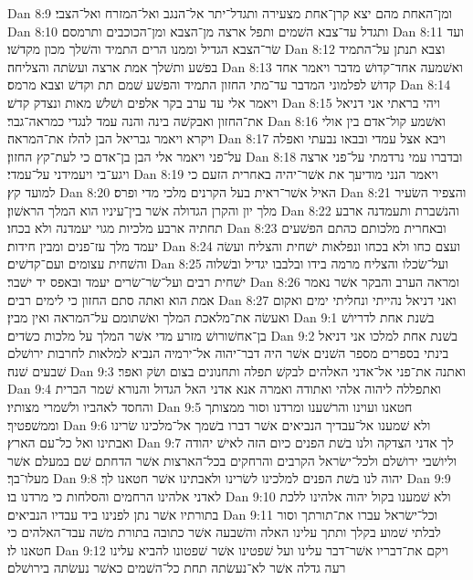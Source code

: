 Dan 8:9  ומן־האחת מהם יצא קרן־אחת מצעירה ותגדל־יתר אל־הנגב ואל־המזרח ואל־הצבי׃
Dan 8:10  ותגדל עד־צבא השׁמים ותפל ארצה מן־הצבא ומן־הכוכבים ותרמסם׃
Dan 8:11  ועד שׂר־הצבא הגדיל וממנו הרים התמיד והשׁלך מכון מקדשׁו׃
Dan 8:12  וצבא תנתן על־התמיד בפשׁע ותשׁלך אמת ארצה ועשׂתה והצליחה׃
Dan 8:13  ואשׁמעה אחד־קדושׁ מדבר ויאמר אחד קדושׁ לפלמוני המדבר עד־מתי החזון התמיד והפשׁע שׁמם תת וקדשׁ וצבא מרמס׃
Dan 8:14  ויאמר אלי עד ערב בקר אלפים ושׁלשׁ מאות ונצדק קדשׁ׃
Dan 8:15  ויהי בראתי אני דניאל את־החזון ואבקשׁה בינה והנה עמד לנגדי כמראה־גבר׃
Dan 8:16  ואשׁמע קול־אדם בין אולי ויקרא ויאמר גבריאל הבן להלז את־המראה׃
Dan 8:17  ויבא אצל עמדי ובבאו נבעתי ואפלה על־פני ויאמר אלי הבן בן־אדם כי לעת־קץ החזון׃
Dan 8:18  ובדברו עמי נרדמתי על־פני ארצה ויגע־בי ויעמידני על־עמדי׃
Dan 8:19  ויאמר הנני מודיעך את אשׁר־יהיה באחרית הזעם כי למועד קץ׃
Dan 8:20  האיל אשׁר־ראית בעל הקרנים מלכי מדי ופרס׃
Dan 8:21  והצפיר השׂעיר מלך יון והקרן הגדולה אשׁר בין־עיניו הוא המלך הראשׁון׃
Dan 8:22  והנשׁברת ותעמדנה ארבע תחתיה ארבע מלכיות מגוי יעמדנה ולא בכחו׃
Dan 8:23  ובאחרית מלכותם כהתם הפשׁעים יעמד מלך עז־פנים ומבין חידות׃
Dan 8:24  ועצם כחו ולא בכחו ונפלאות ישׁחית והצליח ועשׂה והשׁחית עצומים ועם־קדשׁים׃
Dan 8:25  ועל־שׂכלו והצליח מרמה בידו ובלבבו יגדיל ובשׁלוה ישׁחית רבים ועל־שׂר־שׂרים יעמד ובאפס יד ישׁבר׃
Dan 8:26  ומראה הערב והבקר אשׁר נאמר אמת הוא ואתה סתם החזון כי לימים רבים׃
Dan 8:27  ואני דניאל נהייתי ונחליתי ימים ואקום ואעשׂה את־מלאכת המלך ואשׁתומם על־המראה ואין מבין׃
Dan 9:1  בשׁנת אחת לדריושׁ בן־אחשׁורושׁ מזרע מדי אשׁר המלך על מלכות כשׂדים׃
Dan 9:2  בשׁנת אחת למלכו אני דניאל בינתי בספרים מספר השׁנים אשׁר היה דבר־יהוה אל־ירמיה הנביא למלאות לחרבות ירושׁלם שׁבעים שׁנה׃
Dan 9:3  ואתנה את־פני אל־אדני האלהים לבקשׁ תפלה ותחנונים בצום ושׂק ואפר׃
Dan 9:4  ואתפללה ליהוה אלהי ואתודה ואמרה אנא אדני האל הגדול והנורא שׁמר הברית והחסד לאהביו ולשׁמרי מצותיו׃
Dan 9:5  חטאנו ועוינו והרשׁענו ומרדנו וסור ממצותך וממשׁפטיך׃
Dan 9:6  ולא שׁמענו אל־עבדיך הנביאים אשׁר דברו בשׁמך אל־מלכינו שׂרינו ואבתינו ואל כל־עם הארץ׃
Dan 9:7  לך אדני הצדקה ולנו בשׁת הפנים כיום הזה לאישׁ יהודה וליושׁבי ירושׁלם ולכל־ישׂראל הקרבים והרחקים בכל־הארצות אשׁר הדחתם שׁם במעלם אשׁר מעלו־בך׃
Dan 9:8  יהוה לנו בשׁת הפנים למלכינו לשׂרינו ולאבתינו אשׁר חטאנו לך׃
Dan 9:9  לאדני אלהינו הרחמים והסלחות כי מרדנו בו׃
Dan 9:10  ולא שׁמענו בקול יהוה אלהינו ללכת בתורתיו אשׁר נתן לפנינו ביד עבדיו הנביאים׃
Dan 9:11  וכל־ישׂראל עברו את־תורתך וסור לבלתי שׁמוע בקלך ותתך עלינו האלה והשׁבעה אשׁר כתובה בתורת משׁה עבד־האלהים כי חטאנו לו׃
Dan 9:12  ויקם את־דבריו אשׁר־דבר עלינו ועל שׁפטינו אשׁר שׁפטונו להביא עלינו רעה גדלה אשׁר לא־נעשׂתה תחת כל־השׁמים כאשׁר נעשׂתה בירושׁלם׃

